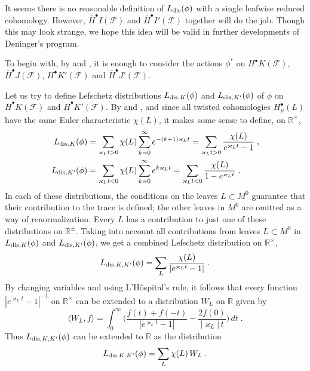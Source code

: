\documentclass{memo-l}
\theoremstyle{plain}
\theoremstyle{definition}
\theoremstyle{remark}
\newcommand{\R}{\mathbb{R}}
\newcommand{\FF}{\mathcal{F}}
\newcommand{\Ldis}{L_{\text{\rm dis}}}
\newcommand{\LdisK}{L_{\text{\rm dis},K}}
\newcommand{\LdisdK}{L_{\text{\rm dis},K'}}
\newcommand{\LdisKdK}{L_{\text{\rm dis},K,K'}}
\numberwithin{section}{chapter}
\numberwithin{equation}{section}%
\begin{document}
It seems there is no reasonable definition of $\Ldis(\phi)$ with a single leafwise reduced cohomology. However, $\bar H^\bullet I(\FF)$ and $\bar H^\bullet I'(\FF)$ together will do the job. Though this may look strange, we hope this idea will be valid in further developments of Deninger's program.

To begin with, by  and , it is enough to consider the actions $\phi^*$ on $H^\bullet K(\FF)$, $\bar H^\bullet J(\FF)$, $H^\bullet K'(\FF)$ and $\bar H^\bullet J'(\FF)$.  

Let us try to define Lefschetz distributions $\LdisK(\phi)$ and $\LdisdK(\phi)$ of $\phi$ on $\bar H^\bullet K(\FF)$ and $\bar H^\bullet K'(\FF)$. By  and , and since all twisted cohomologies $H_\mu^\bullet(L)$ have the same Euler characteristic $\chi(L)$, it makes some sense to define, on $\R^\times$,
\begin{align*}
\LdisK(\phi)&=\sum_{\varkappa_Lt>0}\chi(L)\sum_{k=0}^\infty e^{-(k+1)\varkappa_Lt}
=\sum_{\varkappa_Lt>0}\frac{\chi(L)}{e^{\varkappa_Lt}-1}\;,\\
\LdisdK(\phi)&=\sum_{\varkappa_Lt<0}\chi(L)\sum_{k=0}^\infty e^{k\varkappa_Lt}
=\sum_{\varkappa_Lt<0}\frac{\chi(L)}{1-e^{\varkappa_Lt}}\;.
\end{align*}
In each of these distributions, the conditions on the leaves $L\subset M^0$ guarantee that their contribution to the trace is defined; the other leaves in $M^0$ are omitted as a way of renormalization. Every $L$ has a contribution to just one of these distributions on $\R^\pm$. Taking into account all contributions from leaves $L\subset M^0$ in $\LdisK(\phi)$ and $\LdisdK(\phi)$, we get a combined Lefschetz distribution on $\R^\times$,
\[
\LdisKdK(\phi)=\sum_L\frac{\chi(L)}{|e^{\varkappa_Lt}-1|}\;.
\]
By changing variables and using L'H\^ospital's rule, it follows that every function $|e^{\varkappa_Lt}-1|^{-1}$ on $\R^\times$ can be extended to a distribution $W_L$ on $\R$ given by \cite{Barner1981}
\[
\langle W_L,f\rangle=\int_0^\infty\bigg(\frac{f(t)+f(-t)}{|e^{\varkappa_Lt}-1|}-\frac{2f(0)}{|\varkappa_L|\,t}\bigg)\,dt\;.
\]
Thus $\LdisKdK(\phi)$ can be extended to $\R$ as the distribution
\[
\LdisKdK(\phi)=\sum_L\chi(L)\,W_L\;.
\]
\end{document}
